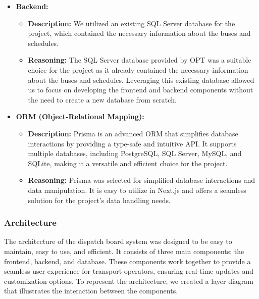 \documentclass[10pt]{article}
\begin{document}
\begin{itemize}
                \item \textbf{Backend:}
                \begin{itemize}
                    \item \textbf{Description:} We utilized an existing SQL Server database for the project, which contained the necessary information about the buses and schedules.
                    \item \textbf{Reasoning:} The SQL Server database provided by OPT was a suitable choice for the project as it already contained the necessary information about the buses and schedules. Leveraging this existing database allowed us to focus on developing the frontend and backend components without the need to create a new database from scratch.
                \end{itemize}

                \item \textbf{ORM (Object-Relational Mapping):}
                \begin{itemize}
                    \item \textbf{Description:} Prisma is an advanced ORM that simplifies database interactions by providing a type-safe and intuitive API. It supports multiple databases, including PostgreSQL, SQL Server, MySQL, and SQLite, making it a versatile and efficient choice for the project.
                    \item \textbf{Reasoning:} Prisma was selected for simplified database interactions and data manipulation. It is easy to utilize in Next.js and offers a seamless solution for the project's data handling needs.
                \end{itemize}
        \end{itemize}


        \subsubsection{Architecture}
        The architecture of the dispatch board system was designed to be easy to maintain, easy to use, and efficient. It consists of three main components: the frontend, backend, and database. These components work together to provide a seamless user experience for transport operators, ensuring real-time updates and customization options. To represent the architecture, we created a layer diagram that illustrates the interaction between the components.
\end{document}
